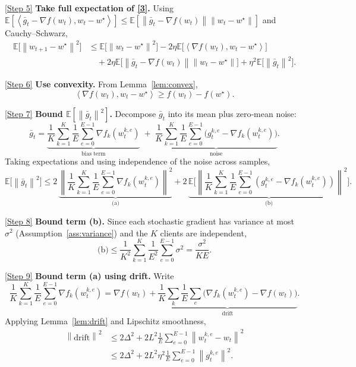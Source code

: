 \documentclass[11pt]{article}
\newcommand{\E}{\mathbb{E}}
\newcommand{\norm}[1]{\left\lVert#1\right\rVert}
\newcommand{\inner}[2]{\left\langle #1,#2\right\rangle}
\begin{document}
\noindent\underline{[Step 5]} \textbf{Take full expectation of \eqref{3}.}  
Using $\E[\inner{\bar g_t-\nabla f(w_t)}{w_t-w^\star}]\le
\E[\norm{\bar g_t-\nabla f(w_t)}\norm{w_t-w^\star}]$ and Cauchy–Schwarz,
\[
\begin{aligned}
\E\!\big[\norm{w_{t+1}-w^\star}^2\big]
&\le \E\!\big[\norm{w_t-w^\star}^2\big]
-2\eta\E\!\big[\inner{\nabla f(w_t)}{w_t-w^\star}\big] \\
&\quad +2\eta\E\!\big[\norm{\bar g_t-\nabla f(w_t)}\norm{w_t-w^\star}\big]
+\eta^2\E\!\big[\norm{\bar g_t}^2\big]. \tag{7}
\end{aligned}
\]

\noindent\underline{[Step 6]} \textbf{Use convexity.}  
From Lemma~\ref{lem:convex},
\[
\inner{\nabla f(w_t)}{w_t-w^\star}\ge f(w_t)-f(w^\star). \tag{8}
\]

\noindent\underline{[Step 7]} \textbf{Bound $\E[\norm{\bar g_t}^2]$.}  
Decompose $\bar g_t$ into its mean plus zero‑mean noise:
\[
\bar g_t = \underbrace{\frac1{K}\sum_{k=1}^{K}\frac1E\sum_{e=0}^{E-1}
\nabla f_k(w_{t}^{k,e})}_{\text{bias term}}
\;+\;
\underbrace{\frac1{K}\sum_{k=1}^{K}\frac1E\sum_{e=0}^{E-1}
\big(g_{t}^{k,e}-\nabla f_k(w_{t}^{k,e})\big)}_{\text{noise}} .
\]
Taking expectations and using independence of the noise across samples,
\[
\E\!\big[\norm{\bar g_t}^2\big]
\le 2\,\underbrace{\norm{\frac1{K}\sum_{k=1}^{K}\frac1E\sum_{e=0}^{E-1}
\nabla f_k(w_{t}^{k,e})}^2}_{\text{(a)}}
+2\,\underbrace{\E\!\big[\norm{\frac1{K}\sum_{k=1}^{K}\frac1E\sum_{e=0}^{E-1}
(g_{t}^{k,e}-\nabla f_k(w_{t}^{k,e}))}^2\big]}_{\text{(b)}} . \tag{9}
\]

\noindent\underline{[Step 8]} \textbf{Bound term (b).}  
Since each stochastic gradient has variance at most $\sigma^2$ (Assumption~\ref{ass:variance}) and the $K$ clients are independent,
\[
\text{(b)}\le\frac{1}{K^2}\sum_{k=1}^{K}\frac1{E^2}\sum_{e=0}^{E-1}\sigma^2
= \frac{\sigma^2}{K E}. \tag{10}
\]

\noindent\underline{[Step 9]} \textbf{Bound term (a) using drift.}  
Write
\[
\frac1{K}\sum_{k=1}^{K}\frac1E\sum_{e=0}^{E-1}
\nabla f_k(w_{t}^{k,e})
= \nabla f(w_t)+\underbrace{\frac1{K}\sum_{k}\frac1E\sum_{e}
\big(\nabla f_k(w_{t}^{k,e})-\nabla f(w_t)\big)}_{\text{drift}} .
\]
Applying Lemma~\ref{lem:drift} and Lipschitz smoothness,
\[
\begin{aligned}
\norm{\text{drift}}^2
&\le 2\Delta^2
+2L^2\frac1{E}\sum_{e=0}^{E-1}\norm{w_{t}^{k,e}-w_t}^2\\
&\le 2\Delta^2
+2L^2\eta^2\frac1{E}\sum_{e=0}^{E-1}\norm{g_{t}^{k,e}}^2 .
\end{aligned}
\tag{11}
\]
\end{document}
